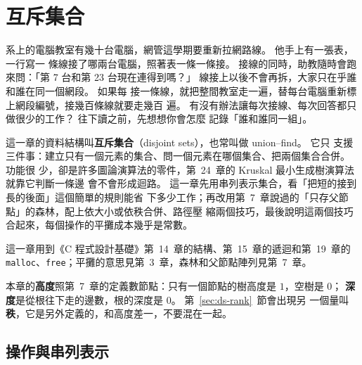 \chapter{互斥集合}
\label{ch:disjoint}


系上的電腦教室有幾十台電腦，網管這學期要重新拉網路線。 他手上有一張表，一行寫一
條線接了哪兩台電腦，照著表一條一條接。 接線的同時，助教隨時會跑來問：「第 7 台和第
23 台現在連得到嗎？」 線接上以後不會再拆，大家只在乎誰和誰在同一個網段。 如果每
接一條線，就把整間教室走一遍，替每台電腦重新標上網段編號，接幾百條線就要走幾百
遍。 有沒有辦法讓每次接線、每次回答都只做很少的工作？ 往下讀之前，先想想你會怎麼
記錄「誰和誰同一組」。

這一章的資料結構叫\textbf{互斥集合}（disjoint sets），也常叫做 union--find。 它只
支援三件事：建立只有一個元素的集合、問一個元素在哪個集合、把兩個集合合併。 功能很
少，卻是許多圖論演算法的零件，第~24~章的 Kruskal 最小生成樹演算法就靠它判斷一條邊
會不會形成迴路。 這一章先用串列表示集合，看「把短的接到長的後面」這個簡單的規則能省
下多少工作；再改用第~7~章說過的「只存父節點」的森林，配上依大小或依秩合併、路徑壓
縮兩個技巧，最後說明這兩個技巧合起來，每個操作的平攤成本幾乎是常數。

這一章用到《C 程式設計基礎》第~14~章的結構、第~15~章的遞迴和第~19~章的
\texttt{malloc}、\texttt{free}；平攤的意思見第~3~章，森林和父節點陣列見第~7~章。

本章的\textbf{高度}照第~7~章的定義數節點：只有一個節點的樹高度是 $1$，空樹是 $0$；
\textbf{深度}是從根往下走的邊數，根的深度是 $0$。 第~\ref{sec:ds-rank}~節會出現另
一個量叫\textbf{秩}，它是另外定義的，和高度差一，不要混在一起。

\section{操作與串列表示}
\label{sec:ds-list}


